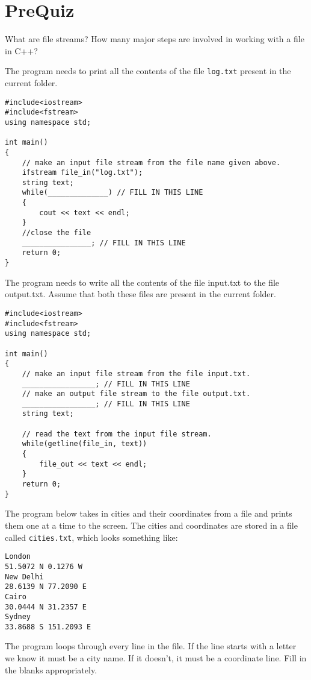 \section{PreQuiz}

\begin{problem}
    What are file streams? How many major steps are involved in working with a file in C++?
\end{problem}

\begin{problem}
    The program needs to print all the contents of the file \texttt{log.txt} present in the current folder.
\end{problem}

\begin{verbatim}
#include<iostream>
#include<fstream>
using namespace std;

int main() 
{
    // make an input file stream from the file name given above.
    ifstream file_in("log.txt"); 
    string text;  
    while(______________) // FILL IN THIS LINE
    {      
        cout << text << endl;
    }
    //close the file
    ________________; // FILL IN THIS LINE
    return 0;
}
\end{verbatim}


\begin{problem}
    The program needs to write all the contents of the file input.txt to the file output.txt. Assume that both these files are present in the current folder.
\end{problem}

\begin{verbatim}
#include<iostream>
#include<fstream>
using namespace std;

int main() 
{
    // make an input file stream from the file input.txt.
    _________________; // FILL IN THIS LINE
    // make an output file stream to the file output.txt.
    _________________; // FILL IN THIS LINE
    string text; 

    // read the text from the input file stream.
    while(getline(file_in, text))
    {
        file_out << text << endl;
    }
    return 0;
}
\end{verbatim}

\begin{problem}
    The program below takes in cities and their coordinates from a file and prints them one at a time to the screen. The cities and coordinates are stored in a file called \texttt{cities.txt}, which looks something like:

\begin{verbatim}
London
51.5072 N 0.1276 W
New Delhi
28.6139 N 77.2090 E
Cairo
30.0444 N 31.2357 E
Sydney
33.8688 S 151.2093 E
\end{verbatim}


The program loops through every line in the file. If the line starts with a letter we know it must be a city name. If it doesn't, it must be a coordinate line. Fill in the blanks appropriately.
\end{problem}

